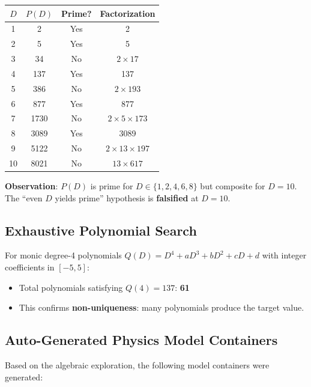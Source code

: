 \documentclass[11pt,a4paper]{article}
\begin{document}
\begin{center}
\begin{tabular}{cccc}
\hline
$D$ & $P(D)$ & Prime? & Factorization \\
\hline
1 & 2 & Yes & 2 \\
2 & 5 & Yes & 5 \\
3 & 34 & No & $2 \times 17$ \\
4 & 137 & Yes & 137 \\
5 & 386 & No & $2 \times 193$ \\
6 & 877 & Yes & 877 \\
7 & 1730 & No & $2 \times 5 \times 173$ \\
8 & 3089 & Yes & 3089 \\
9 & 5122 & No & $2 \times 13 \times 197$ \\
10 & 8021 & No & $13 \times 617$ \\
\hline
\end{tabular}
\end{center}

\textbf{Observation}: $P(D)$ is prime for $D \in \{1, 2, 4, 6, 8\}$ but composite for $D = 10$. The ``even $D$ yields prime'' hypothesis is \textbf{falsified} at $D = 10$.

\subsection{Exhaustive Polynomial Search}

For monic degree-4 polynomials $Q(D) = D^4 + aD^3 + bD^2 + cD + d$ with integer coefficients in $[-5, 5]$:
\begin{itemize}
    \item Total polynomials satisfying $Q(4) = 137$: \textbf{61}
    \item This confirms \textbf{non-uniqueness}: many polynomials produce the target value.
\end{itemize}

\subsection{Auto-Generated Physics Model Containers}

Based on the algebraic exploration, the following model containers were generated:
\end{document}

